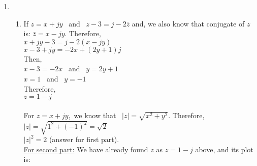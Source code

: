 \documentclass[10pt,a4paper, margin=1in]{article}
\begin{document}
\begin{enumerate}
\item %
    \begin{enumerate}
    \item %
    If $z = x +jy$ \ and \ $z-3 = j -2\bar{z}$ and, we also know that conjugate of $z$ is: $\bar{z} = x - jy$. Therefore,  \\
    $x+jy-3 = j - 2(x-jy)$ \\
    $x-3 + jy = -2x + (2y+1)j$ \\
    Then, \\
    $x -3 = -2x$ \ and \ $y = 2y+1$ \\
    $x = 1$ \ and \ $y = -1$ \\
    Therefore, \\
    $z = 1-j$ \\
    \\
    For $z = x+jy$,\  we know that \ $|z| = \sqrt{x^2 + y^2}$. Therefore, \\
    $|z| = \sqrt{1^2 + (-1)^2} = \sqrt{2}$ \\
    $|z|^2 = 2$ (answer for first part).
    \\
    \underline{For second part:} We have already found $z$ as $z = 1-j$ above, and its plot is: \\
    
    

\end{enumerate}
\end{enumerate}
\end{document}
